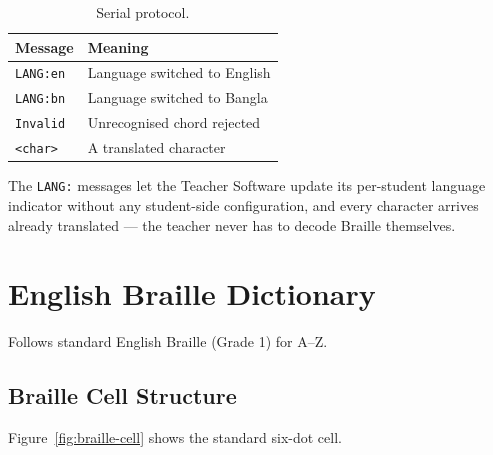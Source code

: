 \documentclass[11pt,a4paper,twoside]{article}
\begin{document}
\begin{table}[H]\centering
\caption{Serial protocol.}\label{tab:serial-protocol}
\begin{tabular}{l l}\toprule
\textbf{Message} & \textbf{Meaning} \\\midrule
\texttt{LANG:en} & Language switched to English \\
\texttt{LANG:bn} & Language switched to Bangla \\
\texttt{Invalid} & Unrecognised chord rejected \\
\texttt{<char>} & A translated character \\\bottomrule
\end{tabular}\end{table}

The \texttt{LANG:} messages let the Teacher Software update its per-student
language indicator without any student-side configuration, and every
character arrives already translated --- the teacher never has to decode
Braille themselves.

\section{English Braille Dictionary}

Follows standard English Braille (Grade 1) for A--Z.

\subsection{Braille Cell Structure}
Figure~\ref{fig:braille-cell} shows the standard six-dot cell.
\end{document}
